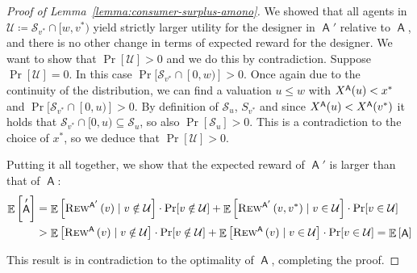 \documentclass[11pt,letterpaper]{article}
\newcommand{\sqbr}[1]{\left[ #1 \right]}
\DeclareMathOperator*{\E}{\bb{E}}
\newcommand{\bb}[1]{\mathbb{#1}}
\DeclareMathOperator{\A}{\auc{A}}
\renewcommand{\S}{\mathcal{S}}
\newcommand{\vstar}{{v^*}}
\newcommand{\xstar}{{x^*}}
\theoremstyle{plain}
\newcommand{\auc}[1]{\mathsf{#1}}
\begin{document}
\begin{proof}[Proof of Lemma~\ref{lemma:consumer-surplus-amono}]
    We showed that all agents in $\mathcal{U}\coloneq\S_{\vstar}\cap[w,\vstar)$ yield strictly larger utility for the designer in $\A'$ relative to $\A$, and there is no other change in terms of expected reward for the designer. We want to show that $\Pr[\mathcal{U}]>0$ and we do this by contradiction. Suppose $\Pr[\mathcal{U}]=0$. In this case $\Pr[\S_{\vstar}\cap[0,w)]>0$. Once again due to the continuity of the distribution, we can find a valuation $u\leq w$ with $\x[\A]{u}<\xstar$ and  $\Pr[\S_{\vstar}\cap[0,u)]>0$.
    By definition of $\S_u$, $S_{\vstar}$ and since $\x[\A]{u}<\x[\A]{\vstar}$  it holds that $\S_{\vstar}\cap[0,u)\subseteq\S_u$, so also $\Pr[\S_u]>0$. This is a contradiction to the choice of $\xstar$, so we deduce that $\Pr[\mathcal{U}]>0$.

    Putting it all together, we show that the expected reward of $\A'$ is larger than that of $\A$:
    \begin{align*}
        \E\sqbr{\A'}&=\E\sqbr{\trew[\A']{v}\mid v\notin\mathcal{U}}\cdot\Pr[v\notin\mathcal{U}]+\E\sqbr{\rew[\A']{v}{\vstar}\mid v\in\mathcal{U}}\cdot\Pr[v\in\mathcal{U}]\\
        &>\E\sqbr{\trew[\A]{v}\mid v\notin\mathcal{U}}\cdot\Pr[v\notin\mathcal{U}]+\E\sqbr{\trew[\A]{v}\mid v\in\mathcal{U}}\cdot\Pr[v\in\mathcal{U}]
        =\E\sqbr{\A}
    \end{align*}

    This result is in contradiction to the optimality of $\A$, completing the proof.
\end{proof}
\end{document}
